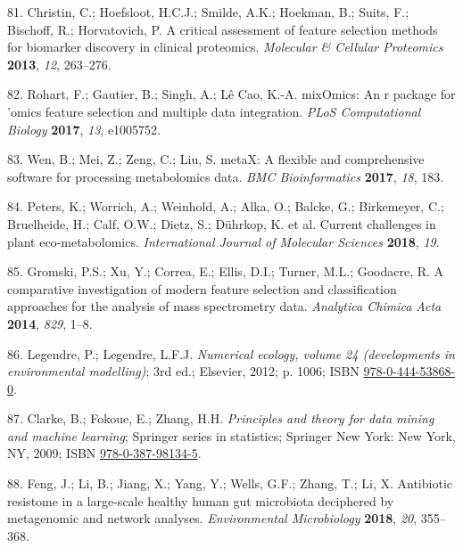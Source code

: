\documentclass[]{article}
\begin{document}
\leavevmode\hypertarget{ref-christin_2013}{}%
81. Christin, C.; Hoefsloot, H.C.J.; Smilde, A.K.; Hoekman, B.; Suits, F.; Bischoff, R.; Horvatovich, P. A critical assessment of feature selection methods for biomarker discovery in clinical proteomics. \emph{Molecular \& Cellular Proteomics} \textbf{2013}, \emph{12}, 263--276.

\leavevmode\hypertarget{ref-rohart_2017}{}%
82. Rohart, F.; Gautier, B.; Singh, A.; Lê Cao, K.-A. mixOmics: An r package for 'omics feature selection and multiple data integration. \emph{PLoS Computational Biology} \textbf{2017}, \emph{13}, e1005752.

\leavevmode\hypertarget{ref-wen_2017}{}%
83. Wen, B.; Mei, Z.; Zeng, C.; Liu, S. metaX: A flexible and comprehensive software for processing metabolomics data. \emph{BMC Bioinformatics} \textbf{2017}, \emph{18}, 183.

\leavevmode\hypertarget{ref-peters_2018}{}%
84. Peters, K.; Worrich, A.; Weinhold, A.; Alka, O.; Balcke, G.; Birkemeyer, C.; Bruelheide, H.; Calf, O.W.; Dietz, S.; Dührkop, K. et al. Current challenges in plant eco-metabolomics. \emph{International Journal of Molecular Sciences} \textbf{2018}, \emph{19}.

\leavevmode\hypertarget{ref-gromski_2014}{}%
85. Gromski, P.S.; Xu, Y.; Correa, E.; Ellis, D.I.; Turner, M.L.; Goodacre, R. A comparative investigation of modern feature selection and classification approaches for the analysis of mass spectrometry data. \emph{Analytica Chimica Acta} \textbf{2014}, \emph{829}, 1--8.

\leavevmode\hypertarget{ref-legendre_2012}{}%
86. Legendre, P.; Legendre, L.F.J. \emph{Numerical ecology, volume 24 (developments in environmental modelling)}; 3rd ed.; Elsevier, 2012; p. 1006; ISBN \href{https://worldcat.org/isbn/978-0-444-53868-0}{978-0-444-53868-0}.

\leavevmode\hypertarget{ref-clarke_2009}{}%
87. Clarke, B.; Fokoue, E.; Zhang, H.H. \emph{Principles and theory for data mining and machine learning}; Springer series in statistics; Springer New York: New York, NY, 2009; ISBN \href{https://worldcat.org/isbn/978-0-387-98134-5}{978-0-387-98134-5}.

\leavevmode\hypertarget{ref-feng_2018}{}%
88. Feng, J.; Li, B.; Jiang, X.; Yang, Y.; Wells, G.F.; Zhang, T.; Li, X. Antibiotic resistome in a large-scale healthy human gut microbiota deciphered by metagenomic and network analyses. \emph{Environmental Microbiology} \textbf{2018}, \emph{20}, 355--368.
\end{document}
